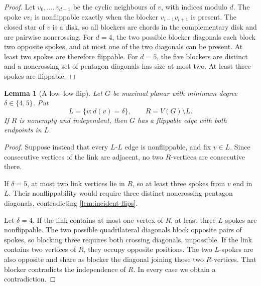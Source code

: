 \documentclass[11pt]{article}
\newtheorem{lemma}[theorem]{Lemma}
\theoremstyle{definition}
\theoremstyle{remark}
\begin{document}
\begin{proof}
Let \(v_0,\ldots,v_{d-1}\) be the cyclic neighbours of \(v\), with indices
modulo \(d\).  The spoke \(vv_i\) is nonflippable exactly when the blocker
\(v_{i-1}v_{i+1}\) is present.  The closed star of \(v\) is a disk, so all
blockers are chords in the complementary disk and are pairwise noncrossing.
For \(d=4\), the two possible blocker diagonals each block two opposite
spokes, and at most one of the two diagonals can be present.  At least two
spokes are therefore flippable.  For \(d=5\), the five blockers are distinct
and a noncrossing set of pentagon diagonals has size at most two.  At least
three spokes are flippable.
\end{proof}

\begin{lemma}[A low--low flip]\label{lem:low-low-flip}
Let \(G\) be maximal planar with minimum degree \(\delta\in\{4,5\}\).  Put
\[
 L=\{v:d(v)=\delta\},\qquad R=V(G)\setminus L.
\]
If \(R\) is nonempty and independent, then \(G\) has a flippable edge with
both endpoints in \(L\).
\end{lemma}

\begin{proof}
Suppose instead that every \(L\)-\(L\) edge is nonflippable, and fix
\(v\in L\).  Since consecutive vertices of the link are adjacent, no two
\(R\)-vertices are consecutive there.

If \(\delta=5\), at most two link vertices lie in \(R\), so at least three
spokes from \(v\) end in \(L\).  Their nonflippability would require three
distinct noncrossing pentagon diagonals, contradicting
\cref{lem:incident-flips}.

Let \(\delta=4\).  If the link contains at most one vertex of \(R\), at
least three \(L\)-spokes are nonflippable.  The two possible quadrilateral
diagonals block opposite pairs of spokes, so blocking three requires both
crossing diagonals, impossible.  If the link contains two vertices of
\(R\), they occupy opposite positions.  The two \(L\)-spokes are also
opposite and share as blocker the diagonal joining those two \(R\)-vertices.
That blocker contradicts the independence of \(R\).  In every case we obtain
a contradiction.
\end{proof}
\end{document}
